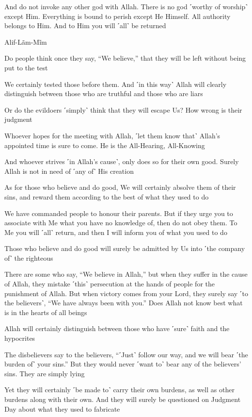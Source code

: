And do not invoke any other god with Allah. There is no god ˹worthy of worship˺ except Him. Everything is bound to perish except He Himself. All authority belongs to Him. And to Him you will ˹all˺ be returned

Alif-Lãm-Mĩm

Do people think once they say, “We believe,” that they will be left without being put to the test

We certainly tested those before them. And ˹in this way˺ Allah will clearly distinguish between those who are truthful and those who are liars

Or do the evildoers ˹simply˺ think that they will escape Us? How wrong is their judgment

Whoever hopes for the meeting with Allah, ˹let them know that˺ Allah’s appointed time is sure to come. He is the All-Hearing, All-Knowing

And whoever strives ˹in Allah’s cause˺, only does so for their own good. Surely Allah is not in need of ˹any of˺ His creation

As for those who believe and do good, We will certainly absolve them of their sins, and reward them according to the best of what they used to do

We have commanded people to honour their parents. But if they urge you to associate with Me what you have no knowledge of, then do not obey them. To Me you will ˹all˺ return, and then I will inform you of what you used to do

Those who believe and do good will surely be admitted by Us into ˹the company of˺ the righteous

There are some who say, “We believe in Allah,” but when they suffer in the cause of Allah, they mistake ˹this˺ persecution at the hands of people for the punishment of Allah. But when victory comes from your Lord, they surely say ˹to the believers˺, “We have always been with you.” Does Allah not know best what is in the hearts of all beings

Allah will certainly distinguish between those who have ˹sure˺ faith and the hypocrites

The disbelievers say to the believers, “˹Just˺ follow our way, and we will bear ˹the burden of˺ your sins.” But they would never ˹want to˺ bear any of the believers’ sins. They are simply lying

Yet they will certainly ˹be made to˺ carry their own burdens, as well as other burdens along with their own. And they will surely be questioned on Judgment Day about what they used to fabricate

